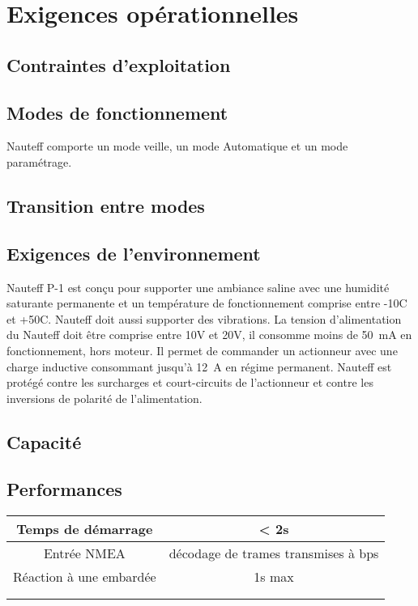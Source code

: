 \documentclass[a4paper,11pt]{report}
\begin{document}
\section{Exigences opérationnelles}
\subsection{Contraintes d'exploitation}
\subsection{Modes de fonctionnement}
Nauteff comporte un mode veille, un mode Automatique et un mode paramétrage.
\subsection{Transition entre modes}
\subsection{Exigences de l'environnement}
Nauteff P-1 est conçu pour supporter une ambiance saline avec une humidité
saturante permanente et un température de fonctionnement comprise entre   -10\degres C et +50\degres C.
Nauteff doit aussi supporter des vibrations.
La tension d'alimentation du Nauteff doit être comprise entre 10V et 20V, il consomme moins de 50~mA en fonctionnement, hors moteur.
Il permet de commander un actionneur avec une charge inductive consommant jusqu'à
12\ A en régime permanent.
Nauteff est protégé contre les surcharges et court-circuits de l'actionneur et 
contre les inversions de polarité de l'alimentation.
\subsection{Capacité}
\subsection{Performances}
\begin{tabular}{|c|c|}
	\hline 
	Temps de démarrage &  < 2s \\ 
	\hline 
	Entrée NMEA& décodage de trames transmises à \numprint{38400} bps \\ 
	\hline 
	Réaction à une embardée & 1s max \\ 
	\hline 
	&  \\ 
	\hline 
	&  \\ 
	\hline 
\end{tabular}
\end{document}
